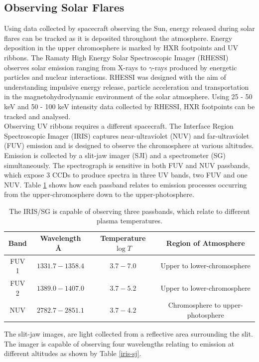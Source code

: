 \subsection{Observing Solar Flares}
Using data collected by spacecraft observing the Sun, energy released during solar flares can be tracked as it is deposited throughout the atmosphere. Energy deposition in the upper chromosphere is marked by HXR footpoints and UV ribbons. The Ramaty High Energy Solar Spectroscopic Imager (RHESSI) observes solar emission ranging from X-rays to $\gamma$-rays produced by energetic particles and nuclear interactions. RHESSI was designed with the aim of understanding impulsive energy release, particle acceleration and transportation in the magnetohydrodynamic environment of the solar atmosphere. Using 25 - 50 keV and 50 - 100 keV intensity data collected by RHESSI, HXR footpoints can be tracked and analysed. \\
Observing UV ribbons requires a different spacecraft. The Interface Region Spectroscopic Imager (IRIS) captures near-ultraviolet (NUV) and far-ultraviolet (FUV) emission and is designed to observe the chromosphere at various altitudes. Emission is collected by a slit-jaw imager (SJI) and a spectrometer (SG) simultaneously. The spectrograph is sensitive in both FUV and NUV passbands, which expose 3 CCDs to produce spectra in three UV bands, two FUV and one NUV. Table \ref{iris-sg} shows how each passband relates to emission processes occurring from the upper-chromosphere down to the upper-photosphere. 

\begin{table}[H]
\centering
\begin{tabular}{|c|c|c|c|}
Band & Wavelength \AA\ & Temperature $\log{T}$ & Region of Atmosphere\\ 
\hline
FUV 1 & $1331.7 - 1358.4$ & $3.7 - 7.0$ & Upper to lower-chromosphere\\ 
FUV 2 & $1389.0 - 1407.0$ & $3.7 - 5.2$ & Upper to lower-chromosphere\\ 
NUV & $2782.7 - 2851.1$ & $3.7 - 4.2$ & Chromosphere to upper-photosphere\\ 
\end{tabular}
\caption{The IRIS/SG is capable of observing three passbands, which relate to different plasma temperatures.}\label{iris-sg}
\end{table}

The slit-jaw images, are light collected from a reflective area surrounding the slit. The imager is capable of observing four wavelengths relating to emission at different altitudes as shown by Table \ref{iris-sj}. 

